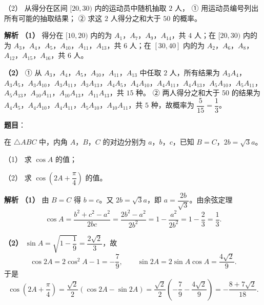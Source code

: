\begin{answer}
（2） 从得分在区间 $[20,30)$ 内的运动员中随机抽取 $2$ 人，
① 用运动员编号列出所有可能的抽取结果；
② 求这 $2$ 人得分之和大于 $50$ 的概率。

\textbf{解析}
\textbf{（1）} 得分在 $[10,20)$ 内的为 $A_1$，$A_7$，$A_9$，$A_{14}$，共 $4$ 人；在 $[20,30)$ 内的为 $A_3$，$A_4$，$A_5$，$A_{10}$，$A_{11}$，$A_{13}$，共 $6$ 人；在 $[30,40]$ 内的为 $A_2$，$A_6$，$A_8$，$A_{12}$，$A_{15}$，$A_{16}$，共 $6$ 人。

\textbf{（2）} ① 从 $A_3$，$A_4$，$A_5$，$A_{10}$，$A_{11}$，$A_{13}$ 中任取 $2$ 人，所有结果为
$A_3A_4$，$A_3A_5$，$A_3A_{10}$，$A_3A_{11}$，$A_3A_{13}$，$A_4A_5$，$A_4A_{10}$，$A_4A_{11}$，$A_4A_{13}$，$A_5A_{10}$，$A_5A_{11}$，$A_5A_{13}$，$A_{10}A_{11}$，$A_{10}A_{13}$，$A_{11}A_{13}$，共 $15$ 种。
② 两人得分之和大于 $50$ 的结果为 $A_4A_5$，$A_4A_{10}$，$A_4A_{11}$，$A_5A_{10}$，$A_{10}A_{11}$，共 $5$ 种，故概率为 $\dfrac5{15}=\dfrac13$。

\gkanswer{答案（1）：$[10,20)$ 内 $4$ 人，$[20,30)$ 内 $6$ 人，$[30,40]$ 内 $6$ 人。}


\end{answer}
\begin{answer}

\textbf{题目}：

在 $\triangle ABC$ 中，内角 $A$，$B$，$C$ 的对边分别为 $a$，$b$，$c$，已知 $B=C$，$2b=\sqrt3a$。

（1） 求 $\cos A$ 的值；

（2） 求 $\cos\left(2A+\dfrac\pi4\right)$ 的值。

\textbf{解析}
\textbf{（1）} 由 $B=C$ 得 $b=c$。又 $2b=\sqrt3a$，即 $a=\dfrac{2b}{\sqrt3}$。由余弦定理
\nopagebreak[4]
\[\cos A=\frac{b^2+c^2-a^2}{2bc}=\frac{2b^2-a^2}{2b^2}=1-\frac{a^2}{2b^2}=1-\frac{2}{3}=\frac13.\]

\textbf{（2）} $\sin A=\sqrt{1-\dfrac19}=\dfrac{2\sqrt2}3$，故
\nopagebreak[4]
\[\cos2A=2\cos^2A-1=-\frac79,\qquad \sin2A=2\sin A\cos A=\frac{4\sqrt2}9.\]
于是
\nopagebreak[4]
\[\cos\left(2A+\frac\pi4\right)=\frac{\sqrt2}2(\cos2A-\sin2A)=\frac{\sqrt2}2\left(-\frac79-\frac{4\sqrt2}9\right)=-\frac{8+7\sqrt2}{18}.\]



\end{answer}
